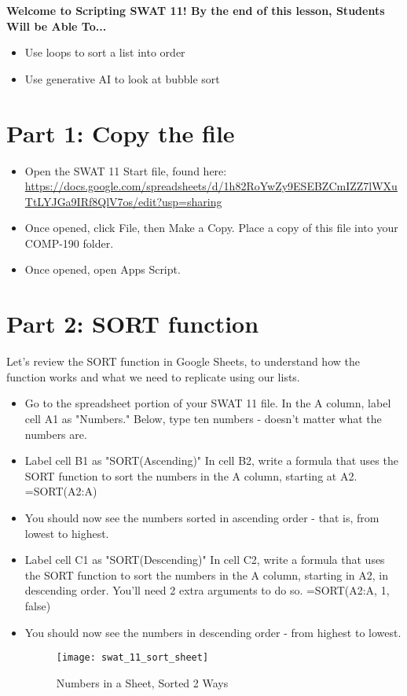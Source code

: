 \documentclass{article}
\newcommand{\AName}{Scripting SWAT 11}
\begin{document}
\textbf{Welcome to \AName!  By the end of this lesson, Students Will be Able To...}
\begin{itemize}
    \item Use loops to sort a list into order
    \item Use generative AI to look at bubble sort
\end{itemize}


\section*{Part 1: Copy the file}
\begin{itemize}
    \item Open the SWAT 11 Start file, found here:  \url{https://docs.google.com/spreadsheets/d/1h82RoYwZy9ESEBZCmIZZ7lWXuTtLYJGa9IRf8QlV7os/edit?usp=sharing}
    \item Once opened, click File, then Make a Copy.  Place a copy of this file into your COMP-190 folder.
    \item Once opened, open Apps Script.
\end{itemize}

\section*{Part 2: SORT function}
Let's review the SORT function in Google Sheets, to understand how the function works and what we need to replicate using our lists.
\begin{itemize}
    \item Go to the spreadsheet portion of your SWAT 11 file.  In the A column, label cell A1 as "Numbers."  Below, type ten numbers - doesn't matter what the numbers are.
    \item Label cell B1 as "SORT(Ascending)"  In cell B2, write a formula that uses the SORT function to sort the numbers in the A column, starting at A2.  =SORT(A2:A)
    \item You should now see the numbers sorted in ascending order - that is, from lowest to highest.
    \item Label cell C1 as "SORT(Descending)"  In cell C2, write a formula that uses the SORT function to sort the numbers in the A column, starting in A2, in descending order.  You'll need 2 extra arguments to do so.  =SORT(A2:A, 1, false)
    \item You should now see the numbers in descending order - from highest to lowest.
    \begin{figure}[H]
  		\centering
  		\texttt{[image: swat\_11\_sort\_sheet]}
  		\caption{Numbers in a Sheet, Sorted 2 Ways}
	\end{figure}
\end{itemize}
\end{document}
